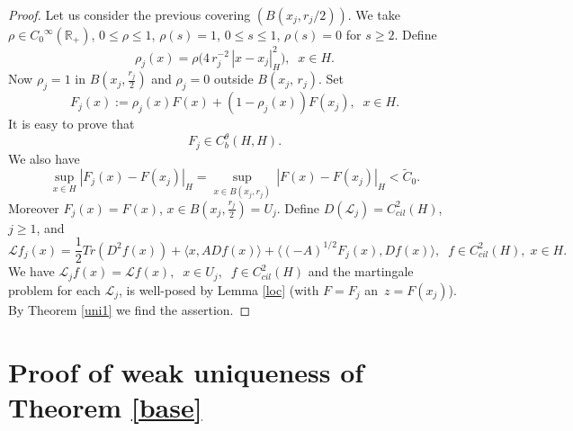 \documentclass[preprint]{imsart}
\def\R{\mathbb R}
\def\L{\mathcal L}
\begin{document}
\begin{proof}
   Let us consider the previous covering $(B(x_j, r_j/2))$.   We take  $\rho \in { C_0}^{\infty}(\R_+)$, 
  $0 \le \rho \le 1$, $\rho(s)=1$, $0 \le s  \le 1$, $\rho(s) =0$ for $s \ge 2$.
   Define 
   $$
   \rho_j (x) = \rho \big ( 4\,  r_j^{-2}\, |x- x_j|^2_H \big), \;\; x \in H.     
 $$ 
Now  $\rho_{j} =1$ in $B(x_j, \frac{r_j}{2})$ and  $\rho_j =0$ outside $B(x_j,   
 \, r_j )$. Set
 $$
 F_j(x) :=  \rho_{j}(x) F(x)  +  (1 - \rho_{j}(x))F(x_{j} ), \;\;  x\in H.
 $$ 
 It is easy to prove that 
 \begin{equation} \label{qaa}
   F_{j} \in C_b^{\theta}(H,H).
 \end{equation}
% 
We also have
 \begin{equation*}
 \sup_{x \in H}| F_j(x) - F(x_j) |_H  =  \sup_{x \in B(x_j, r_j)} \, | F(x) - F(x_j) |_H < {\tilde  C_0}.
 \end{equation*}
 Moreover   $F_j(x) = F(x)$, $x \in B(x_j, \frac{r_j}{2}) = U_j$. Define  
$D(\L_j) = C^2_{cil}(H)$, $j \ge 1$, and   
$$
\L f_j (x) = \frac{1}{2} Tr(D^2 f(x)) + \langle x, ADf(x) \rangle +
\langle (-A)^{1/2} F_j(x), Df(x) \rangle,\;\; f \in C^2_{cil}(H),\; x \in H.
$$
  We have 
 $\L_j f(x) =  {\L} f(x),\;\; x \in U_j,\;\; f \in C^2_{cil}(H)$ and 
  the martingale problem  for each $\L_j$,
  is well-posed by Lemma  \ref{loc} (with $F= F_j$ an\ $z = F(x_j)$).  By Theorem \ref{uni1} we find the assertion.   
   \end{proof}
 
 

\section{Proof of weak  uniqueness of Theorem \ref{base}
}   
\end{document}
